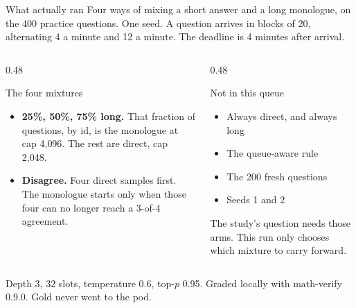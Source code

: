 \documentclass[aspectratio=169,11pt]{beamer}
\newcommand{\src}[1]{\par\vfill\begin{minipage}{0.96\textwidth}\color{muted}\tiny #1\end{minipage}\vspace{-0.2em}}
\begin{document}
\begin{frame}{What actually ran}
  Four ways of mixing a short answer and a long monologue, on the 400 practice questions.
  One seed. A question arrives in blocks of 20, alternating 4 a minute and 12 a minute.
  The deadline is 4 minutes after arrival.
  \vspace{0.35em}
  \begin{columns}[T]
    \begin{column}{0.48\textwidth}
      \begin{block}{The four mixtures}
        \small
        \begin{itemize}\setlength\itemsep{0.2em}
          \item \textbf{25\%, 50\%, 75\% long.} That fraction of questions, by id, is the monologue at cap 4{,}096. The rest are direct, cap 2{,}048.
          \item \textbf{Disagree.} Four direct samples first. The monologue starts only when those four can no longer reach a 3-of-4 agreement.
        \end{itemize}
      \end{block}
    \end{column}
    \begin{column}{0.48\textwidth}
      \begin{block}{Not in this queue}
        \small
        \begin{itemize}\setlength\itemsep{0.2em}
          \item Always direct, and always long
          \item The queue-aware rule
          \item The 200 fresh questions
          \item Seeds 1 and 2
        \end{itemize}
        \vspace{0.15em}
        {\scriptsize\color{muted} The study's question needs those arms.
        This run only chooses which mixture to carry forward.}
      \end{block}
    \end{column}
  \end{columns}
  \src{Depth 3, 32 slots, temperature 0.6, top-$p$ 0.95. Graded locally with math-verify 0.9.0. Gold never went to the pod.}
\end{frame}
\end{document}
